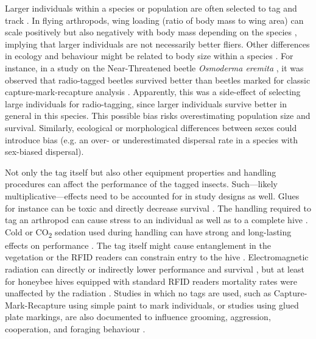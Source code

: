 \documentclass[10pt, twoside]{book} %
\begin{document}
	Larger individuals within a species or population are often selected to tag and track \citep[e.g.][]{hedin2002, hardersen2007, lenaour2019}. In flying arthropods, wing loading (ratio of body mass to wing area) can scale positively but also negatively with body mass depending on the species \citep{boiteau2001, gilchrist2004, darveau2005}, implying that larger individuals are not necessarily better fliers. Other differences in ecology and behaviour might be related to body size within a species \citep{hillaert2018}. For instance, in a study on the Near-Threatened beetle \textit{Osmoderma eremita} \citep{nieto2010}, it was observed that radio-tagged beetles survived better than beetles marked for classic capture-mark-recapture analysis \citep{legouar2015}. Apparently, this was a side-effect of selecting large individuals for radio-tagging, since larger individuals survive better in general in this species. This possible bias risks overestimating population size and survival. Similarly, ecological or morphological differences between sexes could introduce bias (e.g. an over- or underestimated dispersal rate in a species with sex-biased dispersal).\\
	\clearpage
	
	Not only the tag itself but also other equipment properties and handling procedures can affect the performance of the tagged insects. Such---likely multiplicative---effects need to be accounted for in study designs as well. Glues for instance can be toxic and directly decrease survival \citep{boiteau2009}. The handling required to tag an arthropod can cause stress to an individual as well as to a complete hive \citep{desouza2018}. Cold or CO\textsubscript{2} sedation used during handling can have strong and long-lasting effects on performance \citep{poissonnier2015}. The tag itself might cause entanglement in the vegetation \citep{boiteau2011} or the RFID readers can constrain entry to the hive \citep{desouza2018}. Electromagnetic radiation can directly or indirectly lower performance and survival \citep{cucurachi2013}, but at least for honeybee hives equipped with standard RFID readers mortality rates were unaffected by the radiation \citep{darney2016}. Studies in which no tags are used, such as Capture-Mark-Recapture using simple paint to mark individuals, or studies using glued plate markings, are also documented to influence grooming, aggression, cooperation, and foraging behaviour \citep{packer2005a, desouza2012, switzer2016}.\\
	
\end{document}

